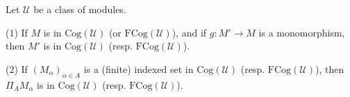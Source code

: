 Let $\mathcal{U}$ be a class of modules.

(1) If $M$ is in $\mathrm{Cog}(\mathcal{U})$ (or $\mathrm{FCog}(\mathcal{U})$), and if $g: M' \rightarrow M$ is a monomorphism, then $M'$ is in $\mathrm{Cog}(\mathcal{U})$ (resp. $\mathrm{FCog}(\mathcal{U})$).

(2) If $(M_\alpha)_{\alpha \in A}$ is a (finite) indexed set in $\mathrm{Cog}(\mathcal{U})$ (resp. $\mathrm{FCog}(\mathcal{U})$), then $\Pi_A M_\alpha$ is in $\mathrm{Cog}(\mathcal{U})$ (resp. $\mathrm{FCog}(\mathcal{U})$).
